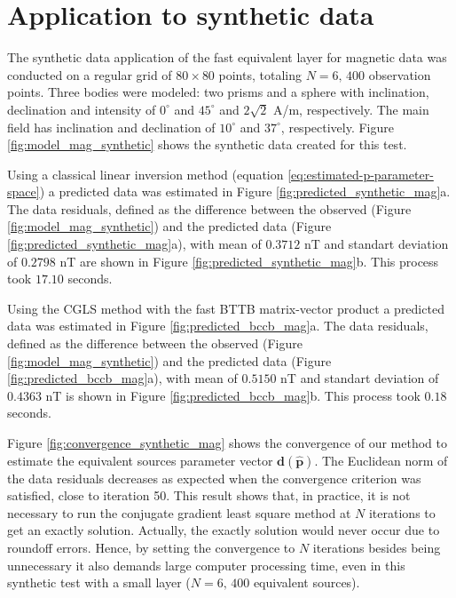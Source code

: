 \section{Application to synthetic data}

The synthetic data application of the fast equivalent layer for magnetic data was conducted on a regular grid of  $80 \times 80$ points, totaling $N = 6,\, 400$ observation points. Three bodies were modeled: two prisms and a sphere with inclination, declination and intensity of $0^{\circ}$ and $45^{\circ}$ and $2\sqrt{2}$ A/m, respectively. The main field has inclination and declination of $10^{\circ}$ and $37^{\circ}$, respectively. Figure \ref{fig:model_mag_synthetic} shows the synthetic data created for this test.

Using a classical linear inversion method (equation \ref{eq:estimated-p-parameter-space}) a predicted data was estimated in Figure \ref{fig:predicted_synthetic_mag}a. The data residuals,  defined as the difference between the observed (Figure \ref{fig:model_mag_synthetic}) and the predicted data 
(Figure \ref{fig:predicted_synthetic_mag}a), with mean of $0.3712$ nT and standart deviation of $0.2798$ nT are shown in Figure \ref{fig:predicted_synthetic_mag}b. This process took $17.10$ seconds.

Using the CGLS method with the fast BTTB matrix-vector product a predicted data was estimated in Figure \ref{fig:predicted_bccb_mag}a. The data residuals, defined as the difference  between the observed (Figure \ref{fig:model_mag_synthetic}) and the predicted data (Figure \ref{fig:predicted_bccb_mag}a), with mean of $0.5150$ nT and standart deviation of $0.4363$ nT is shown in Figure \ref{fig:predicted_bccb_mag}b. 
This process took $0.18$ seconds.

Figure \ref{fig:convergence_synthetic_mag} shows the convergence of our method to estimate the equivalent sources parameter vector $\mathbf{d}(\hat{\mathbf{p}})$. 
The Euclidean norm of the data residuals decreases as expected when the
convergence criterion was satisfied, close to iteration 50. 
This result shows that, in practice, it is not necessary to run the conjugate gradient least square method at $N$ iterations to get an exactly solution.
Actually, the exactly solution  would never occur due to roundoff errors.
Hence, by setting the convergence to  $N$ iterations besides being unnecessary it also demands large computer processing time, even in this synthetic test with a small layer 
($N = 6,\, 400$ equivalent sources). 


